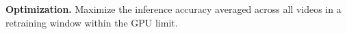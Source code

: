 

\noindent\textbf{Optimization.} Maximize the inference accuracy averaged across all videos in a retraining window within the GPU limit. 

